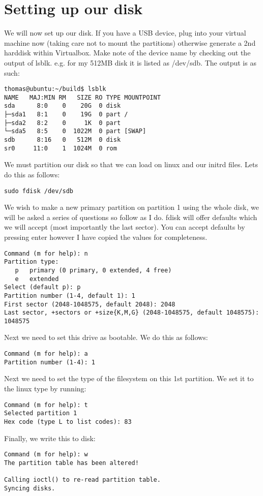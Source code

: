 \documentclass[twocolumn]{article}
\begin{document}
\section{Setting up our disk}
We will now set up our disk. If you have a USB device, plug into your virtual machine now (taking care not to mount the partitions) otherwise generate a 2nd harddisk within Virtualbox. Make note of the device name by checking out the output of lsblk. e.g. for my 512MB disk it is listed as /dev/sdb. The output is as such:
\begin{lstlisting}
thomas@ubuntu:~/build$ lsblk
NAME   MAJ:MIN RM   SIZE RO TYPE MOUNTPOINT
sda      8:0    0    20G  0 disk
├─sda1   8:1    0    19G  0 part /
├─sda2   8:2    0     1K  0 part
└─sda5   8:5    0  1022M  0 part [SWAP]
sdb      8:16   0   512M  0 disk
sr0     11:0    1  1024M  0 rom
\end{lstlisting}
We must partition our disk so that we can load on linux and our initrd files. Lets do this as follows:
\begin{lstlisting}
sudo fdisk /dev/sdb
\end{lstlisting}
We wish to make a new primary partition on partition 1 using the whole disk, we will be asked a series of questions so follow as I do. fdisk will offer defaults which we will accept (most importantly the last sector). You can accept defaults by pressing enter however I have copied the values for completeness.
\begin{lstlisting}
Command (m for help): n
Partition type:
   p   primary (0 primary, 0 extended, 4 free)
   e   extended
Select (default p): p
Partition number (1-4, default 1): 1
First sector (2048-1048575, default 2048): 2048
Last sector, +sectors or +size{K,M,G} (2048-1048575, default 1048575): 1048575
\end{lstlisting}
Next we need to set this drive as bootable. We do this as follows:
\begin{lstlisting}
Command (m for help): a
Partition number (1-4): 1
\end{lstlisting}
Next we need to set the type of the filesystem on this 1st partition. We set it to the linux type by running:
\begin{lstlisting}
Command (m for help): t
Selected partition 1
Hex code (type L to list codes): 83
\end{lstlisting}
Finally, we write this to disk:
\begin{lstlisting}
Command (m for help): w
The partition table has been altered!

Calling ioctl() to re-read partition table.
Syncing disks.
\end{lstlisting}
\end{document}

